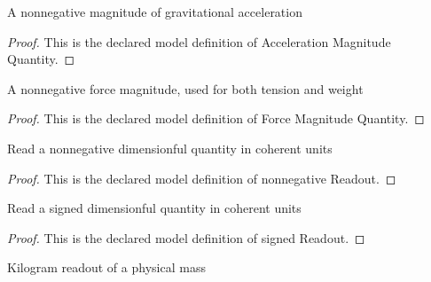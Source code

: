 \begin{definition}
  \label{def:physics:phyx-mini-0802:phyxminiproblems-problemphyxmini0802-accelerationmagnitudequantity}
  A nonnegative magnitude of gravitational acceleration
\end{definition}
\begin{proof}
  This is the declared model definition of Acceleration Magnitude Quantity.
\end{proof}
\begin{definition}
  \label{def:physics:phyx-mini-0802:phyxminiproblems-problemphyxmini0802-forcemagnitudequantity}
  A nonnegative force magnitude, used for both tension and weight
\end{definition}
\begin{proof}
  This is the declared model definition of Force Magnitude Quantity.
\end{proof}
\begin{definition}
  \label{def:physics:phyx-mini-0802:phyxminiproblems-problemphyxmini0802-nonnegativereadout}
  Read a nonnegative dimensionful quantity in coherent units
\end{definition}
\begin{proof}
  This is the declared model definition of nonnegative Readout.
\end{proof}
\begin{definition}
  \label{def:physics:phyx-mini-0802:phyxminiproblems-problemphyxmini0802-signedreadout}
  Read a signed dimensionful quantity in coherent units
\end{definition}
\begin{proof}
  This is the declared model definition of signed Readout.
\end{proof}
\begin{definition}
  \label{def:physics:phyx-mini-0802:phyxminiproblems-problemphyxmini0802-massinkilograms}
  Kilogram readout of a physical mass
\end{definition}
